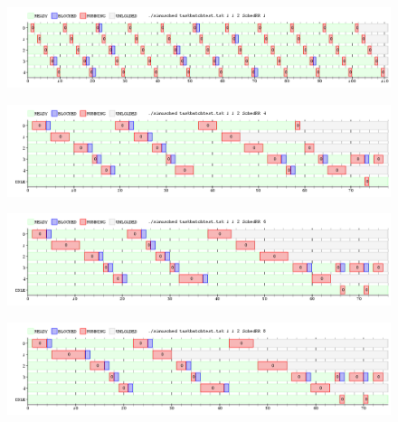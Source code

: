 \begin{figure}[H]
  \centering
\includegraphics[scale=0.45]{graficos/ejercicio7/testTask1.png}
  \caption[Task Batch con un núcleo y quantum 1]{}
\end{figure}


\begin{figure}[H]
  \centering
\includegraphics[scale=0.45]{graficos/ejercicio7/testTask4.png}
  \caption[Task Batch con un núcleo y quantum 4]{}
\end{figure}


\begin{figure}[H]
  \centering
\includegraphics[scale=0.45]{graficos/ejercicio7/testTask6.png}
  \caption[Task Batch con un núcleo y quantum 6]{}
\end{figure}


\begin{figure}[H]
  \centering
\includegraphics[scale=0.45]{graficos/ejercicio7/testTask8.png}
  \caption[Task Batch con un núcleo y quantum 8]{}
\end{figure}
 

